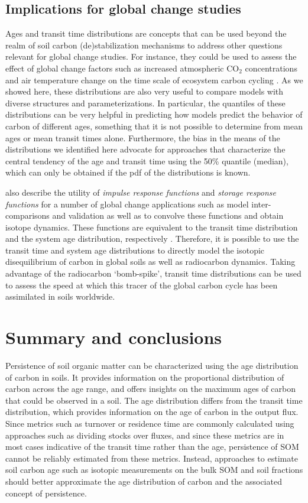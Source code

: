 \documentclass[draft,linenumbers]{agujournal}
\begin{document}
\subsection{Implications for global change studies}
Ages and transit time distributions are concepts that can be used beyond the realm of soil carbon (de)stabilization mechanisms to address other questions relevant for global change studies. For instance, they could be used to assess the effect of global change factors such as increased atmospheric CO$_2$ concentrations and air temperature change on the time scale of ecosystem carbon cycling \citep{Lu2018}. As we showed here, these distributions are also very useful to compare models with diverse structures and parameterizations. In particular, the quantiles of these distributions can be very helpful in predicting how models predict the behavior of carbon of different ages, something that it is not possible to determine from mean ages or mean transit times alone. Furthermore, the bias in the means of the distributions we identified here advocate for approaches that characterize the central tendency of the age and transit time using the 50\% quantile (median), which can only be obtained if the pdf of the distributions is known. 

\citet{Thompson1999} also describe the utility of \emph{impulse response functions} and \emph{storage response functions} for a number of global change applications such as model inter-comparisons and validation as well as to convolve these functions and obtain isotope dynamics. These functions are equivalent to the transit time distribution and the system age distribution, respectively \citep{Metzler2018MG}. Therefore, it is possible to use the transit time and system age distributions to directly model the isotopic disequilibrium of carbon in global soils as well as radiocarbon dynamics. Taking advantage of the radiocarbon `bomb-spike', transit time distributions can be used to assess the speed at which this tracer of the global carbon cycle has been assimilated in soils worldwide. 

\section{Summary and conclusions}
Persistence of soil organic matter can be characterized using the age distribution of carbon in soils. It provides information on the proportional distribution of carbon across the age range, and offers insights on the maximum ages of carbon that could be observed in a soil. The age distribution differs from the transit time distribution, which provides information on the age of carbon in the output flux. Since metrics such as turnover or residence time are commonly calculated using approaches such as dividing stocks over fluxes, and since these metrics are in most cases indicative of the transit time rather than the age, persistence of SOM cannot be reliably estimated from these metrics. Instead, approaches to estimate soil carbon age such as isotopic measurements on the bulk SOM and soil fractions should better approximate the age distribution of carbon and the associated concept of persistence. 
\end{document}
